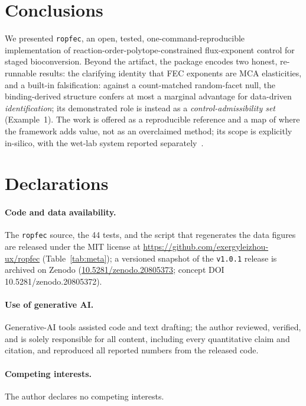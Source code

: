 \documentclass[11pt]{article}
\newcommand{\code}[1]{\texttt{#1}}
\begin{document}
\section{Conclusions}
We presented \code{ropfec}, an open, tested, one-command-reproducible implementation of
reaction-order-polytope-constrained flux-exponent control for staged bioconversion. Beyond
the artifact, the package encodes two honest, re-runnable results: the clarifying identity
that FEC exponents are MCA elasticities, and a built-in falsification: against a count-matched random-facet null, the binding-derived
structure confers at most a marginal advantage for data-driven \emph{identification}; its
demonstrated role is instead as a \emph{control-admissibility set} (Example~1). The
work is offered as a reproducible reference and a map of where the framework adds
value, not as an overclaimed method; its scope is explicitly in-silico, with the wet-lab
system reported separately~\citep{paperA}.

\section*{Declarations}
\paragraph{Code and data availability.} The \code{ropfec} source, the 44 tests, and the
script that regenerates the data figures are released under the MIT license at
\url{https://github.com/exergyleizhou-ux/ropfec} (Table~\ref{tab:meta}); a versioned snapshot
of the \texttt{v1.0.1} release is archived on Zenodo (\href{https://doi.org/10.5281/zenodo.20805373}{10.5281/zenodo.20805373}; concept DOI 10.5281/zenodo.20805372).
\paragraph{Use of generative AI.} Generative-AI tools assisted code and text drafting; the
author reviewed, verified, and is solely responsible for all content, including every
quantitative claim and citation, and reproduced all reported numbers from the released code.
\paragraph{Competing interests.} The author declares no competing interests.
\end{document}

